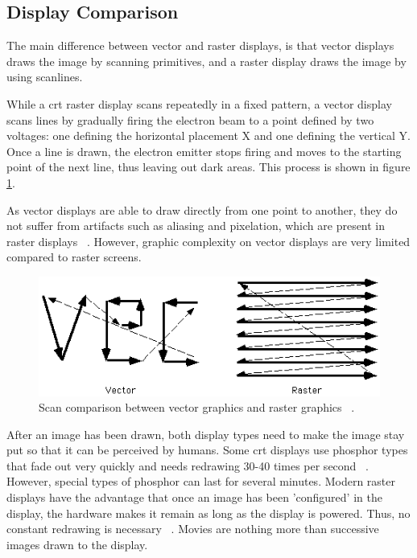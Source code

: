 \subsection{Display Comparison}
The main difference between vector and raster displays, is that vector displays draws the image by scanning primitives, and a raster display draws the image by using scanlines.

While a \gls{crt} raster display scans repeatedly in a fixed pattern, a vector display scans lines by gradually firing the electron beam to a point defined by two voltages: one defining the horizontal placement X and one defining the vertical Y.
Once a line is drawn, the electron emitter stops firing and moves to the starting point of the next line, thus leaving out dark areas.
This process is shown in figure \ref{fig:vectorscan}.

As vector displays are able to draw directly from one point to another, they do not suffer from artifacts such as aliasing and pixelation, which are present in raster displays ~\cite{vector-monitor}.
However, graphic complexity on vector displays are very limited compared to raster screens.

\begin{figure}[h!]
\centering \includegraphics[width=0.8\linewidth]{images/scan.png}
\caption{Scan comparison between vector graphics and raster graphics ~\cite{vecvsras}.}
\label{fig:vectorscan}
\end{figure}

After an image has been drawn, both display types need to make the image stay put so that it can be perceived by humans.
Some \gls{crt} displays use phosphor types that fade out very quickly and needs redrawing 30-40 times per second ~\cite{vector-monitor}.
However, special types of phosphor can last for several minutes.
Modern raster displays have the advantage that once an image has been 'configured' in the display, the hardware makes it remain as long as the display is powered.
Thus, no constant redrawing is necessary ~\cite{LCD-persistence}.
Movies are nothing more than successive images drawn to the display.

